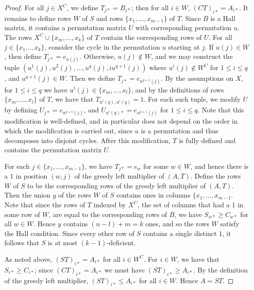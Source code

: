 \documentclass[11pt]{article}
\numberwithin{equation}{section}
\begin{document}
\begin{proof}
  For all $j \in X^C$, we define $T_{j*} = B_{j*}$; then for all $i \in W$,
  $(CT)_{i*} = A_{i*}$. It remains to define rows $W$ of $S$ and rows $\{x_1,
    \ldots, x_{m - 1}\}$ of $T$. Since $B$ is a Hall matrix, it contains a
  permutation matrix $U$ with corresponding permutation $u$. The rows $X^C
  \cup \{x_m, \ldots, x_k\}$ of $T$ contain the corresponding rows of $U$. For
  all $j \in \{x_1 \ldots, x_k\}$, consider the cycle in the permutation $u$
  starting at $j$. If $u(j) \in W$, then define $T_{j*} = e_{u(j)}$. Otherwise,
  $u(j) \not\in W$, and we may construct the tuple $(u^1(j), u^2(j), \ldots,
  u^{q}(j), iu^{q+1}(j))$ where $u^{i}(j) \not\in W^C$ for $1 \leq i \leq q$,
  and $u^{q + 1}(j) \in W$. Then we define $T_{j*} = e_{u^{q + 1}(j)}$. By the
  assumptions on $X$, for $1 \leq i \leq q$ we have $u^{i}(j) \in \{x_m, \ldots,
    x_l\}$, and by the definitions of rows $\{x_m, \ldots, x_l\}$ of $T$, we
  have that $T_{u^{i}(q),u^{i}(q)} = 1$. For each such tuple, we modify $U$ by
  defining $U_{j*} = e_{u^{q + 1}(j)}$, and $U_{u^{i}(q)*} = e_{u^{q + 1}(j)}$
  for $1 \leq i \leq q$. Note that this modification is well-defined, and in
  particular does not depend on the order in which the modification is carried
  out, since $u$ is a permutation and thus decomposes into disjoint cycles.
  After this modification, $T$ is fully defined and contains the permutation
  matrix $U$.

  For each $j \in \{x_1, \ldots, x_{m - 1}\}$, we have $T_{j*} = e_w$ for some
  $w \in W$, and hence there is a $1$ in position $(w, j)$ of the greedy left
  multiplier of $(A, T)$. Define the rows $W$ of $S$ to be the corresponding
  rows of the greedy left multiplier of $(A, T)$. Then the union $y$ of the rows
  $W$ of $S$ contains ones in columns $\{x_1, \ldots, x_{m - 1}$. Note that
    since the rows of $T$ indexed by $X^C$, the set of columns that had a $1$ in
    some row of $W$, are equal to the corresponding rows of $B$, we have $S_{w*}
    \geq C_{w*}$ for all $w \in W$. Hence $y$ contains $(n - l) + m = k$ ones,
    and so the rows $W$ satisfy the Hall condition. Since every other row of $S$
    contains a single distinct $1$, it follows that $S$ is at most $(k -
    1)$-deficient.

  As noted above, $(ST)_{i*} = A_{i*}$ for all $i \in W^C$. For $i \in W$, we
  have that $S_{i*} \geq C_{i*}$; since $(CT)_{i*} = A_{i*}$ we must have
  $(ST)_{i*} \geq A_{i*}$. By the definition of the greedy left multiplier,
  $(ST)_{i*} \leq A_{i*}$ for all $i \in W$. Hence $A = ST$.
    

\end{proof}
\end{document}

